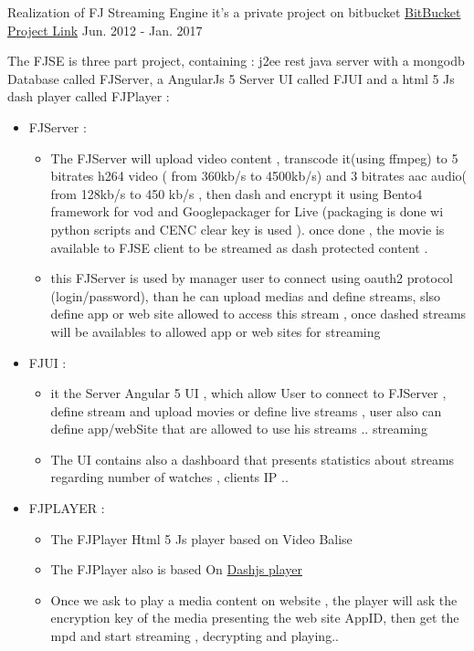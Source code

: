 \begin{cventries}
\cventry
{Realization of FJ Streaming Engine} %
{it's a private project on bitbucket } %
{ \href{https://bitbucket.org/account/user/easysoftin/projects/FJSE}{BitBucket Project Link} }%
{Jun. 2012 - Jan. 2017}  %
{ %
\begin{cvitems}
\item {The FJSE is three part project, containing : j2ee rest java server  with a mongodb Database called FJServer, a AngularJs 5 Server UI called FJUI and a html 5 Js dash player called FJPlayer :}
\begin{itemize}
\item {  FJServer : }
\begin{itemize}
\item{ The FJServer will upload video content ,  transcode it(using ffmpeg) to 5 bitrates h264 video ( from 360kb/s to 4500kb/s) and 3 bitrates aac audio( from 128kb/s to 450 kb/s , then dash and encrypt it using Bento4 framework for vod and Googlepackager for Live (packaging is done wi python scripts and CENC clear key  is used ). once done , the movie is available to FJSE client to be streamed as dash protected content . }
\item {this FJServer is used by manager user to connect using oauth2 protocol (login/password), than he can upload medias and define streams, slso define app or web site allowed to access this stream , once dashed streams will be availables to allowed app or web sites for streaming}
\end{itemize}
\item {FJUI :}
\begin{itemize}
\item {it the Server Angular 5 UI , which allow User  to connect to FJServer , define stream and upload movies or define live streams  , user also can define app/webSite that are allowed to use his streams ..
 streaming}
\item {The UI contains also a dashboard that presents statistics about streams regarding number of watches , clients IP ..}
\end{itemize}
 \item { FJPLAYER :}
 \begin{itemize}
 \item {The FJPlayer Html 5 Js player based on Video Balise }
 \item {The FJPlayer also is based On \href{http://dashif.org/reference/players/javascript/1.4.0/samples/dash-if-reference-player/}{Dashjs player} }
 \item {Once we ask to play a media content on website , the player will ask the encryption key of the media presenting the web site AppID, then get the mpd and start streaming , decrypting  and playing..}
 \end{itemize}
 \end{itemize}
\end{cvitems}
}


\end{cventries}
